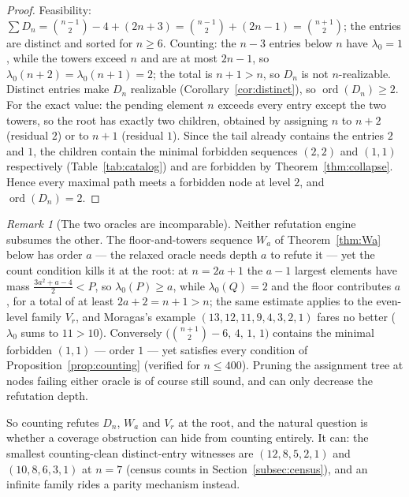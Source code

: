 \documentclass[11pt]{article}
\theoremstyle{definition}
\theoremstyle{remark}
\newtheorem{remark}[theorem]{Remark}
\newcommand{\ord}{\operatorname{ord}}
\begin{document}
\begin{proof}
Feasibility: $\sum D_n=\binom{n-1}{2}-4+(2n+3)=\binom{n-1}{2}+(2n-1)
=\binom{n+1}{2}$; the entries are distinct and sorted for $n\ge6$. Counting: the
$n-3$ entries below $n$ have $\lambda_0=1$, while the towers exceed $n$ and are at
most $2n-1$, so $\lambda_0(n+2)=\lambda_0(n+1)=2$; the total is $n+1>n$, so $D_n$ is
not $n$-realizable. Distinct entries make $D_n$ realizable
(Corollary~\ref{cor:distinct}), so $\ord(D_n)\ge2$. For the exact value: the pending
element $n$ exceeds every entry except the two towers, so the root has exactly two
children, obtained by assigning $n$ to $n+2$ (residual $2$) or to $n+1$ (residual
$1$). Since the tail already contains the entries $2$ and $1$, the children contain
the minimal forbidden sequences $(2,2)$ and $(1,1)$ respectively
(Table~\ref{tab:catalog}) and are forbidden by Theorem~\ref{thm:collapse}. Hence
every maximal path meets a forbidden node at level $2$, and $\ord(D_n)=2$.
\end{proof}

\begin{remark}[The two oracles are incomparable]\label{rem:incomparable}
Neither refutation engine subsumes the other. The floor-and-towers sequence $W_a$ of
Theorem~\ref{thm:Wa} below has order $a$ --- the relaxed oracle needs depth $a$ to
refute it --- yet the count condition kills it at the root: at $n=2a+1$ the $a-1$
largest elements have mass $\tfrac{3a^2+a-4}{2}<P$, so $\lambda_0(P)\ge a$, while
$\lambda_0(Q)=2$ and the floor contributes $a$, for a total of at least
$2a+2=n+1>n$; the
same estimate applies to the even-level family $V_r$, and
Moragas's example $(13,12,11,9,4,3,2,1)$ fares no better ($\lambda_0$ sums to
$11>10$). Conversely $\bigl(\binom{n+1}{2}-6,\,4,\,1,\,1\bigr)$ contains the minimal
forbidden $(1,1)$ --- order $1$ --- yet satisfies every condition of
Proposition~\ref{prop:counting} (verified for $n\le400$). Pruning the assignment
tree at nodes failing either oracle is of course still sound, and can only decrease
the refutation depth.
\end{remark}

So counting refutes $D_n$, $W_a$ and $V_r$ at the root, and the natural question is
whether a coverage obstruction can hide from counting entirely. It can: the smallest
counting-clean distinct-entry witnesses are $(12,8,5,2,1)$ and $(10,8,6,3,1)$ at
$n=7$ (census counts in Section~\ref{subsec:census}), and an infinite family rides a
parity mechanism instead.
\end{document}
